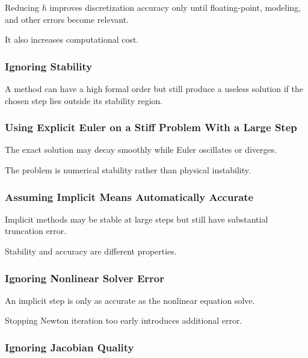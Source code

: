 Reducing \(h\) improves discretization accuracy only until floating-point,
modeling, and other errors become relevant.

It also increases computational cost.

\subsubsection{Ignoring Stability}

A method can have a high formal order but still produce a useless solution
if the chosen step lies outside its stability region.

\subsubsection{Using Explicit Euler on a Stiff Problem With a Large Step}

The exact solution may decay smoothly while Euler oscillates or diverges.

The problem is numerical stability rather than physical instability.

\subsubsection{Assuming Implicit Means Automatically Accurate}

Implicit methods may be stable at large steps but still have substantial
truncation error.

Stability and accuracy are different properties.

\subsubsection{Ignoring Nonlinear Solver Error}

An implicit step is only as accurate as the nonlinear equation solve.

Stopping Newton iteration too early introduces additional error.

\subsubsection{Ignoring Jacobian Quality}

